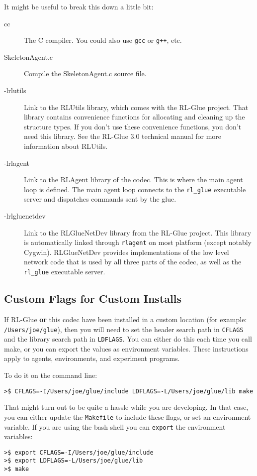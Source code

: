 \documentclass[11pt]{article}
\begin{document}
It might be useful to break this down a little bit:
\begin{description}
\item [cc] The C compiler.  You could also use \texttt{gcc} or \texttt{g++}, etc.
\item [SkeletonAgent.c] Compile the SkeletonAgent.c source file.
\item [-lrlutils] Link to the RLUtils library, which comes with the RL-Glue project.  That library contains convenience functions for allocating and cleaning up the structure types.  If you 
don't use these convenience functions, you don't need this library.  See the RL-Glue 3.0 technical manual for more information about RLUtils.
\item [-lrlagent] Link to the RLAgent library of the codec.  This is where the main agent loop is defined. The main agent loop connects to the \texttt{rl\_glue} executable server and dispatches commands sent by the glue.
\item [-lrlgluenetdev] Link to the RLGlueNetDev library from the RL-Glue project.  This library is automatically linked through \texttt{rlagent} on most platform (except notably Cygwin).  
RLGlueNetDev provides implementations of the low level network code that is used by all three parts of the codec, as well as the \texttt{rl\_glue} executable server.
\end{description}

\subsection{Custom Flags for Custom Installs}
\label{sec:custom-flags}
If RL-Glue \textbf{or} this codec have been installed in a custom location (for example: \texttt{/Users/joe/glue}), then you will
need to set the header search path in \texttt{CFLAGS} and the library search path in \texttt{LDFLAGS}.  You can either do this each time you call make, 
or you can export the values as environment variables.  These instructions apply to agents, environments, and experiment programs.

To do it on the command line:
\begin{verbatim}
>$ CFLAGS=-I/Users/joe/glue/include LDFLAGS=-L/Users/joe/glue/lib make
\end{verbatim}

That might turn out to be quite a hassle while you are developing.  In that case, you can either update the \texttt{Makefile} to include these flags, 
or set an environment variable.  If you are using the bash shell you can \texttt{export} the environment variables:
\begin{verbatim}
>$ export CFLAGS=-I/Users/joe/glue/include
>$ export LDFLAGS=-L/Users/joe/glue/lib
>$ make
\end{verbatim}
\end{document}

